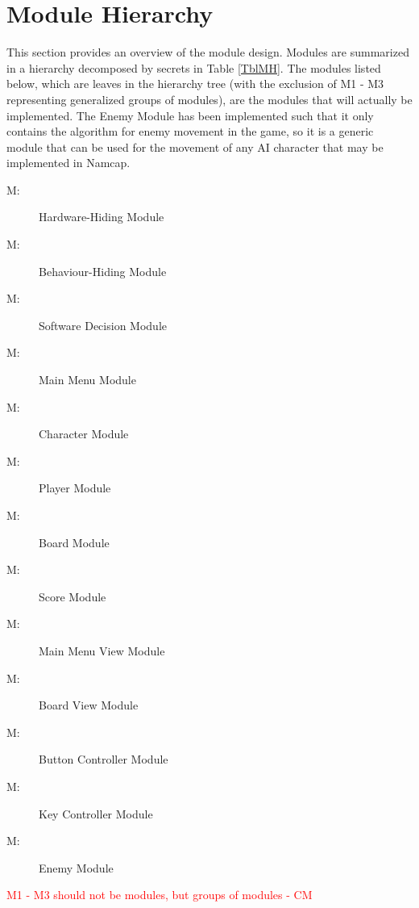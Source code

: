\documentclass[12pt, titlepage]{article}
\newcounter{mnum}
\newcommand{\mthemnum}{M\themnum}
\begin{document}
\section{Module Hierarchy} \label{SecMH}

This section provides an overview of the module design. Modules are summarized
in a hierarchy decomposed by secrets in Table \ref{TblMH}. The modules listed
below, which are leaves in the hierarchy tree (with the exclusion of M1 - M3 representing generalized groups of modules), are the modules that will
actually be implemented. The Enemy Module has been implemented such that it only
contains the algorithm for enemy movement in the game, so it is a generic
module that can be used for the movement of any AI character that may be
implemented in Namcap.

\begin{description}
\item [ \mthemnum \label{mHH}:] Hardware-Hiding Module
\item [ \mthemnum \label{mBH}:] Behaviour-Hiding Module
\item [ \mthemnum \label{mSD}:] Software Decision Module
\item [ \mthemnum \label{mMM}:] Main Menu Module
\item [ \mthemnum \label{mC}:] Character Module
\item [ \mthemnum \label{mP}:] Player Module
\item [ \mthemnum \label{mB}:] Board Module
\item [ \mthemnum \label{mS}:] Score Module
\item [ \mthemnum \label{mMV}:] Main Menu View Module
\item [ \mthemnum \label{mBV}:] Board View Module
\item [ \mthemnum \label{mBC}:] Button Controller Module
\item [ \mthemnum \label{mKC}:] Key Controller Module
\item [ \mthemnum \label{mG}:] Enemy Module
\end{description}
\textcolor{red}{M1 - M3 should not be modules, but groups of modules - CM} \\
\end{document}
